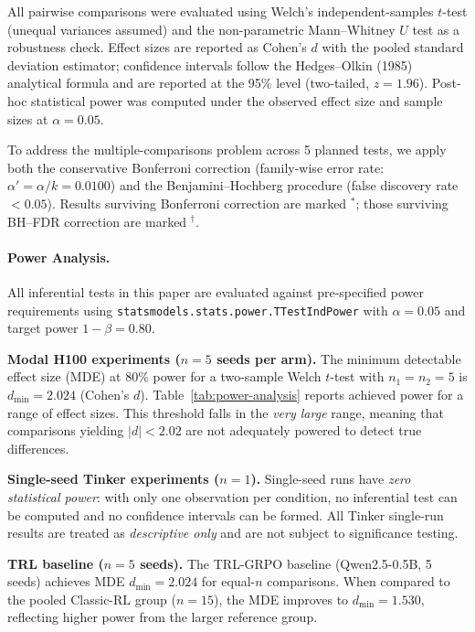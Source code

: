 \documentclass{article}
\begin{document}
All pairwise comparisons were evaluated using Welch's independent-samples $t$-test
(unequal variances assumed) and the non-parametric Mann--Whitney $U$ test as a
robustness check. Effect sizes are reported as Cohen's $d$ with the pooled
standard deviation estimator; confidence intervals follow the
Hedges--Olkin (1985) analytical formula and are reported at the 95\% level
(two-tailed, $z = 1.96$). Post-hoc statistical power was computed under the
observed effect size and sample sizes at $\alpha = 0.05$.

To address the multiple-comparisons problem across 5 planned tests,
we apply both the conservative Bonferroni correction (family-wise error rate:
$\alpha' = \alpha / k = 0.0100$) and the Benjamini--Hochberg procedure
(false discovery rate $< 0.05$). Results surviving Bonferroni correction are
marked $^*$; those surviving BH--FDR correction are marked $^\dag$.

\paragraph{Power Analysis.}
All inferential tests in this paper are evaluated against pre-specified power
requirements using \texttt{statsmodels.stats.power.TTestIndPower} with
$\alpha = 0.05$ and target power $1 - \beta = 0.80$.

\textbf{Modal H100 experiments ($n = 5$ seeds per arm).}
The minimum detectable effect size (MDE) at 80\% power for a two-sample
Welch $t$-test with $n_1 = n_2 = 5$ is
$d_{\min} = 2.024$ (Cohen's $d$).
Table~\ref{tab:power-analysis} reports achieved power for a range of effect sizes.
This threshold falls in the \emph{very large} range, meaning that
comparisons yielding $|d| < 2.02$
are not adequately powered to detect true differences.

\textbf{Single-seed Tinker experiments ($n = 1$).}
Single-seed runs have \emph{zero statistical power}: with only one observation per
condition, no inferential test can be computed and no confidence intervals can be
formed.  All Tinker single-run results are treated as \emph{descriptive only} and
are not subject to significance testing.

\textbf{TRL baseline ($n = 5$ seeds).}
The TRL-GRPO baseline (Qwen2.5-0.5B, 5 seeds) achieves MDE
$d_{\min} = 2.024$ for equal-$n$ comparisons.
When compared to the pooled Classic-RL group ($n = 15$), the MDE
improves to $d_{\min} = 1.530$,
reflecting higher power from the larger reference group.
\end{document}

